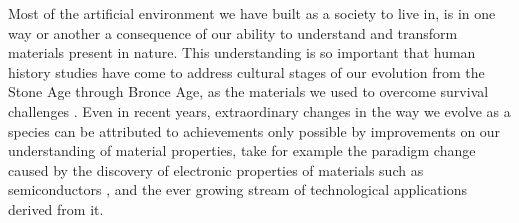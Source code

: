 Most of the artificial environment we have built as a society to live in, is in one way or another a consequence of our ability to understand and transform materials present in nature. This understanding is so important that human history studies have come to address cultural stages of our evolution from the Stone Age through Bronce Age, as the materials we used to overcome survival challenges \cite{Joannopoulos2008}. Even in recent years, extraordinary changes in the way we evolve as a species can be attributed to achievements only possible by improvements on our understanding of material properties, take for example the paradigm change caused by the discovery of electronic properties of materials such as semiconductors \cite{Obayya2011}, and the ever growing stream of technological applications derived from it.

